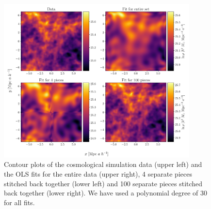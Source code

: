 \documentclass[aps,pra,english,notitlepage,reprint,nofootinbib]{revtex4-1}  %
\begin{document}
\begin{figure}
  \vspace*{-5pt}
  \centering %
  \includegraphics[width=0.9\textwidth]{../figs/density_pieces.pdf}
  \caption{Contour plots of the cosmological simulation data (upper left) and the OLS fits for the entire data (upper right), 4 separate pieces stitched back together (lower left) and 100 separate pieces stitched back together (lower right). We have used a polynomial degree of 30 for all fits.}\label{appfig:density pieces}
  \vspace*{-5pt}
\end{figure}




\end{document}
